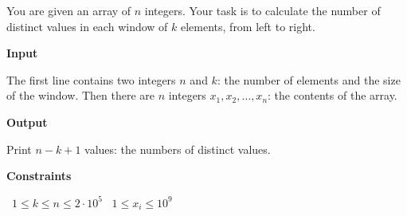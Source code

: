 You are given an array of $n$ integers. Your task is to calculate the number of distinct values in each window of $k$ elements, from left to right.

\vspace{0.3cm}\noindent\textbf{Input}

The first line contains two integers $n$ and $k$: the number of elements and the size of the window.
Then there are $n$ integers $x_1,x_2,\ldots,x_n$: the contents of the array.

\vspace{0.3cm}\noindent\textbf{Output}

Print $n-k+1$ values: the numbers of distinct values.

\vspace{0.3cm}\noindent\textbf{Constraints}

\textbullet\ $1 \le k \le n \le 2 \cdot 10^5$
\textbullet\ $1 \le x_i \le 10^9$